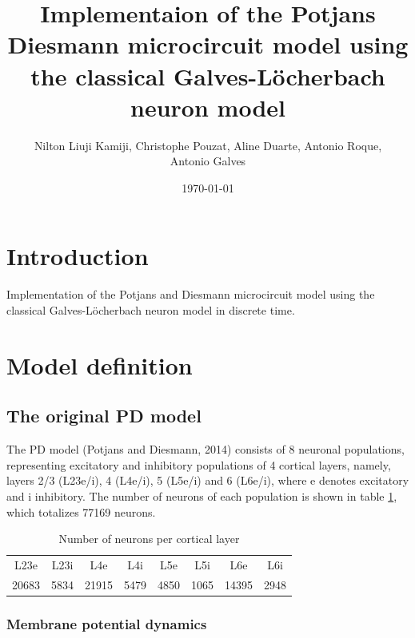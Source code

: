 \documentclass[11pt]{scrartcl}
\author{Nilton Liuji Kamiji, Christophe Pouzat, Aline Duarte, Antonio Roque, \\Antonio Galves}
\date{\today}
\title{Implementaion of the Potjans Diesmann microcircuit model using the classical Galves-L\"{o}cherbach neuron model}
\begin{document}
\maketitle
\tableofcontents
\pagebreak
\listoffigures
\pagebreak

\section{Introduction}
\label{sec:orgf8c6b86}

Implementation of the Potjans and Diesmann \cite{PotjansDiesmann2014} microcircuit model using the classical Galves-L\"{o}cherbach neuron model \cite{GalvesLocherbach2013} in discrete time.

\section{Model definition}
\label{sec:org5936f3e}

\subsection{The original PD model}
\label{sec:org78807a2}
\label{orga6c4122}

The PD model (Potjans and Diesmann, 2014) consists of 8 neuronal populations, representing excitatory and inhibitory populations of 4 cortical layers, namely, layers 2/3 (L23e/i), 4 (L4e/i), 5 (L5e/i) and 6 (L6e/i), where e denotes excitatory and i inhibitory. The number of neurons of each population is shown in table \ref{table:PD_num_neurons}, which totalizes 77169 neurons.
\begin{table}[htbp]
    \centering
    \caption{Number of neurons per cortical layer}
    \label{table:PD_num_neurons}
    \begin{tabular}{llllllll}
         \multicolumn{1}{c}{L23e} & \multicolumn{1}{c}{L23i} & \multicolumn{1}{c}{L4e} & \multicolumn{1}{c}{L4i} & \multicolumn{1}{c}{L5e} & \multicolumn{1}{c}{L5i} & \multicolumn{1}{c}{L6e} & \multicolumn{1}{c}{L6i} \\
         20683 & 5834 & 21915 & 5479 & 4850 & 1065 & 14395 & 2948 
    \end{tabular}
\end{table}

\subsubsection{Membrane potential dynamics}
\label{sec:org9c6a170}
\label{orga332c11}
\end{document}
